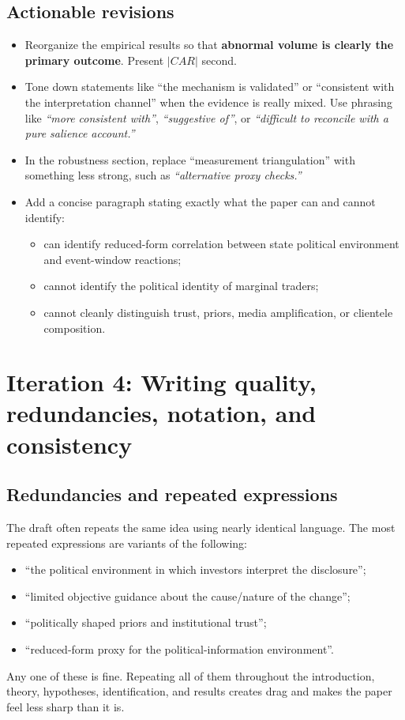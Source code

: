 \documentclass[11pt]{article}
\begin{document}
\subsection*{Actionable revisions}
\begin{itemize}
    \item Reorganize the empirical results so that \textbf{abnormal volume is clearly the primary outcome}. Present $|CAR|$ second.
    \item Tone down statements like ``the mechanism is validated'' or ``consistent with the interpretation channel'' when the evidence is really mixed. Use phrasing like \emph{``more consistent with''}, \emph{``suggestive of''}, or \emph{``difficult to reconcile with a pure salience account.''}
    \item In the robustness section, replace ``measurement triangulation'' with something less strong, such as \emph{``alternative proxy checks.''}
    \item Add a concise paragraph stating exactly what the paper can and cannot identify:
    \begin{itemize}
        \item can identify reduced-form correlation between state political environment and event-window reactions;
        \item cannot identify the political identity of marginal traders;
        \item cannot cleanly distinguish trust, priors, media amplification, or clientele composition.
    \end{itemize}
\end{itemize}

\section*{Iteration 4: Writing quality, redundancies, notation, and consistency}

\subsection*{Redundancies and repeated expressions}
The draft often repeats the same idea using nearly identical language. The most repeated expressions are variants of the following:
\begin{itemize}
    \item ``the political environment in which investors interpret the disclosure'';
    \item ``limited objective guidance about the cause/nature of the change'';
    \item ``politically shaped priors and institutional trust'';
    \item ``reduced-form proxy for the political-information environment''.
\end{itemize}
Any one of these is fine. Repeating all of them throughout the introduction, theory, hypotheses, identification, and results creates drag and makes the paper feel less sharp than it is.
\end{document}
